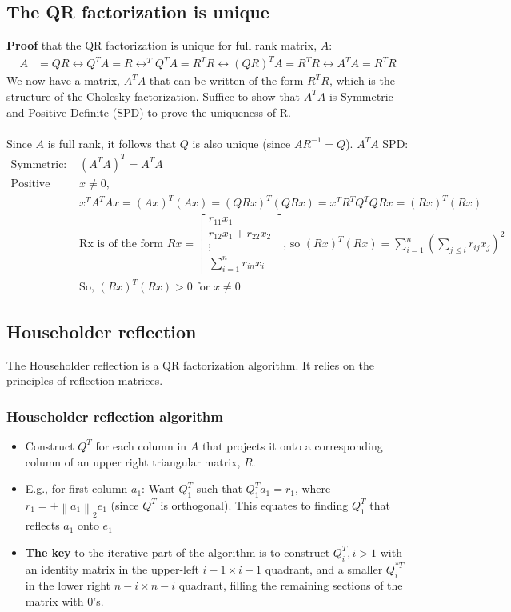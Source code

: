 \documentclass{article}
\newcommand{\norm}[2]{\left\lVert#1\right\rVert_#2}
\begin{document}
\subsection{The QR factorization is unique}
\textbf{Proof} that the QR factorization is unique for full rank matrix, $A$:
\begin{align*}
    A &= QR \longleftrightarrow Q^TA = R \longleftrightarrow ^TQ^TA = R^TR \longleftrightarrow (QR)^TA = R^TR \longleftrightarrow A^TA = R^TR
\end{align*}
We now have a matrix, $A^TA$ that can be written of the form $R^TR$, which is the structure of the Cholesky factorization. Suffice to show that $A^TA$ is Symmetric and Positive Definite (SPD) to prove the uniqueness of R.\\ \\
Since $A$ is full rank, it follows that $Q$ is also unique (since $AR^{-1} = Q$). $A^TA$ SPD:
\begin{align*}
    \textrm{Symmetric: }& (A^TA)^T = A^TA\\
    \textrm{Positive definite: for }& x\neq 0,\\
    & x^TA^TAx = (Ax)^T(Ax) =(QRx)^T(QRx) = x^TR^TQ^TQRx =(Rx)^T(Rx)\\
    & \textrm{Rx is of the form } Rx = \begin{bmatrix} r_{11}x_1 \\ r_{12}x_1 + r_{22}x_2 \\ \vdots \\ \sum_{i=1}^n r_{in}x_i\end{bmatrix} \textrm{, so } (Rx)^T(Rx) = \sum_{i=1}^n (\sum_{j \leq i} r_{ij}x_j)^2\\
    &\textrm{So, } (Rx)^T(Rx) >0 \textrm{ for } x \neq 0
\end{align*}

\subsection{Householder reflection}
The Householder reflection is a QR factorization algorithm. It relies on the principles of reflection matrices.
\subsubsection{Householder reflection algorithm}
\begin{itemize}
    \item Construct $Q^T$ for each column in $A$ that projects it onto a corresponding column of an upper right triangular matrix, $R$.
    \item E.g., for first column $a_1$: Want $Q_1^T$ such that $Q_1^Ta_1 = r_1$, where $r_1 = \pm \norm{a_1}{2}e_1$ (since $Q^T$ is orthogonal). This equates to finding $Q_1^T$ that reflects $a_1$ onto $e_1$
    \item \textbf{The key} to the iterative part of the algorithm is to construct $Q_i^T, i > 1$ with an identity matrix in the upper-left $i-1 \times i-1$ quadrant, and a smaller $Q_i^{*T}$ in the lower right $n-i \times n-i$ quadrant, filling the remaining sections of the matrix with $0$'s.
\end{itemize}
\end{document}
